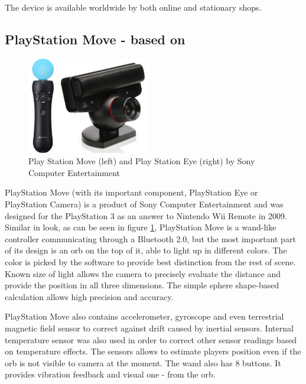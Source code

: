The device is available worldwide by both online and stationary shops.

\subsection[title=Play Station Move]{PlayStation Move - based on \cite{psmove, psmove_spec}}

\begin{figure}
\includegraphics[width=0.48\textwidth]{graphics/move.jpg} 
\caption{Play Station Move (left) and Play Station Eye (right) by Sony Computer Entertainment}
\vspace{-10pt}
\label{fig:move}
\end{figure}

PlayStation Move (with its important component, PlayStation Eye or PlayStation Camera) is a product of Sony Computer Entertainment and was designed for the PlayStation 3 as an answer to Nintendo Wii Remote in 2009. Similar in look, as can be seen in figure \ref{fig:move}, PlayStation Move is a wand-like controller communicating through a Bluetooth 2.0, but the most important part of its design is an orb on the top of it, able to light up in different colors. The color is picked by the software to provide best distinction from the rest of scene. Known size of light allows the camera to precisely evaluate the distance and provide the position in all three dimensions. The simple sphere shape-based calculation allows high precision and accuracy. 

PlayStation Move also contains  accelerometer, gyroscope and even terrestrial magnetic field sensor to correct against drift caused by inertial sensors. Internal temperature sensor was also used in order to correct other sensor readings based on temperature effects. The sensors allows to estimate players position even if the orb is not visible to camera at the moment. The wand also has 8 buttons. It provides vibration feedback and visual one - from the orb.

